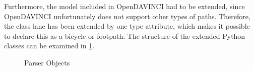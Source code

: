 \documentclass[11pt,oneside,openright]{mpreport}
\begin{document}
Furthermore, the model included in OpenDAVINCI had to be extended, since OpenDAVINCI unfortunately does not support other types of paths.
Therefore, the class lane has been extended by one type attribute, which makes it possible to declare this as a bicycle or footpath.
The structure of the extended Python classes can be examined in \cref{parer_objects}.

\begin{figure}[!ht]
\caption{Parser Objects}

\label{parer_objects}
\end{figure}


% 
\end{document}

